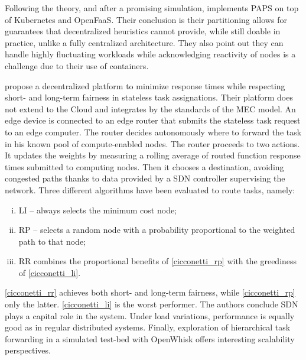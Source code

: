 \documentclass[11pt]{sdm}
\begin{document}
\begin{description}[leftmargin=10pt]
		Following the theory, and after a promising simulation, \citet{baresi_paps_2021} implements \gls{PAPS} on top of Kubernetes and OpenFaaS. Their conclusion is their partitioning allows for guarantees that decentralized heuristics cannot provide, while still doable in practice, unlike a fully centralized architecture. They also point out they can handle highly fluctuating workloads while acknowledging reactivity of nodes is a challenge due to their use of containers.

	\item[\citet{cicconetti_decentralized_2021}] propose a decentralized platform to minimize response times while respecting short- and long-term fairness in stateless task assignations. Their platform does not extend to the Cloud and integrates by the standards of the \gls{MEC} model. An edge device is connected to an edge router that submits the stateless task request to an edge computer. The router decides autonomously where to forward the task in his known pool of compute-enabled nodes. The router proceeds to two actions. It updates the weights by measuring a rolling average of routed function response times submitted to computing nodes. Then it chooses a destination, avoiding congested paths thanks to data provided by a \gls{SDN} controller supervising the network. Three different algorithms have been evaluated to route tasks, namely:
		\begin{enumerate}[(i)]
			\item \label{cicconetti_li} \gls{LI} -- always selects the minimum cost node;
			\item \label{cicconetti_rp} \gls{RP} -- selects a random node with a probability proportional to the weighted path to that node;
			\item \label{cicconetti_rr} \gls{RR} combines the proportional benefits of \cref{cicconetti_rp} with the greediness of \cref{cicconetti_li}.
		\end{enumerate}
		\cref{cicconetti_rr} achieves both short- and long-term fairness, while \cref{cicconetti_rp} only the latter. \cref{cicconetti_li} is the worst performer.
		The authors conclude \gls{SDN} plays a capital role in the system. Under load variations, performance is equally good as in regular distributed systems. Finally, exploration of hierarchical task forwarding in a simulated test-bed with OpenWhisk offers interesting scalability perspectives.


\end{description}
\end{document}
